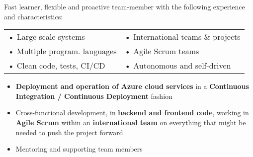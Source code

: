 \documentclass[10pt,a4paper]{altacv}
\begin{document}
\tagline{}

\begin{fullwidth}
\makecvheader
\end{fullwidth}


Fast learner, flexible and proactive team-member with the following experience and characteristics:

\smallskip

\begin{tabularx}{\linewidth}{X X}
	• Large-scale systems         & • International teams \& projects     \\
	• Multiple program. languages & • Agile Scrum teams          \\
	• Clean code, tests, CI/CD    & • Autonomous and self-driven
\end{tabularx}


\begin{itemize}
	\item \textbf{Deployment and operation of Azure cloud services} in a \textbf{Continuous Integration / Continuous Deployment} fashion
	\item Cross-functional development, in \textbf{backend and frontend code},  working in \textbf{Agile Scrum} within an \textbf{international team} on everything that might be needed to push the project forward
	\item Mentoring and supporting team members
\end{itemize}
\end{document}
